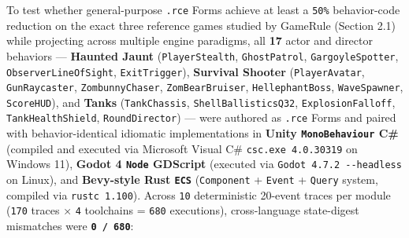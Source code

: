 \documentclass[10pt,letterpaper]{article}
\begin{document}
To test whether general-purpose \texttt{.rce} Forms achieve at least a
\texttt{50\%} behavior-code reduction on the exact three reference games
studied by GameRule (Section 2.1) while projecting across multiple
engine paradigms, all \textbf{17} actor and director behaviors ---
\textbf{Haunted Jaunt} (\texttt{PlayerStealth}, \texttt{GhostPatrol},
\texttt{GargoyleSpotter}, \texttt{ObserverLineOfSight},
\texttt{ExitTrigger}), \textbf{Survival Shooter} (\texttt{PlayerAvatar},
\texttt{GunRaycaster}, \texttt{ZombunnyChaser}, \texttt{ZomBearBruiser},
\texttt{HellephantBoss}, \texttt{WaveSpawner}, \texttt{ScoreHUD}), and
\textbf{Tanks} (\texttt{TankChassis}, \texttt{ShellBallisticsQ32},
\texttt{ExplosionFalloff}, \texttt{TankHealthShield},
\texttt{RoundDirector}) --- were authored as \texttt{.rce} Forms and
paired with behavior-identical idiomatic implementations in
\textbf{Unity \texttt{MonoBehaviour} C\#} (compiled and executed via
Microsoft Visual C\# \texttt{csc.\allowbreak{}exe\ 4.\allowbreak{}0.\allowbreak{}30319} on Windows 11),
\textbf{Godot 4 \texttt{Node} GDScript} (executed via
\texttt{Godot\ 4.\allowbreak{}7.\allowbreak{}2\ -\allowbreak{}\/\allowbreak{}-\allowbreak{}headless} on Linux), and \textbf{Bevy-style
Rust \texttt{ECS}} (\texttt{Component} + \texttt{Event} + \texttt{Query}
system, compiled via \texttt{rustc\ 1.\allowbreak{}100}). Across \texttt{10}
deterministic 20-event traces per module (\texttt{170} traces ×
\texttt{4} toolchains = \texttt{680} executions), cross-language
state-digest mismatches were \textbf{\texttt{0\ /\ 680}}:
\end{document}

